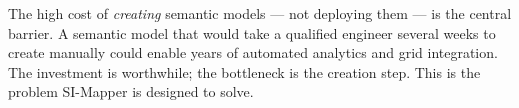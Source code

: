 The high cost of \emph{creating} semantic models --- not deploying them --- is the central barrier.
A semantic model that would take a qualified engineer several weeks to create manually could enable
years of automated analytics and grid integration.
The investment is worthwhile; the bottleneck is the creation step.
This is the problem SI-Mapper is designed to solve.
